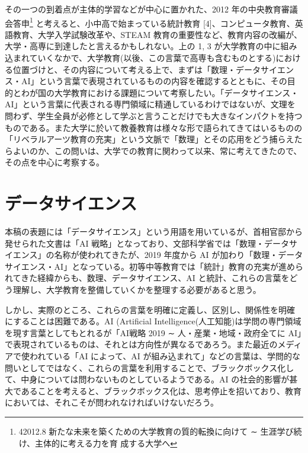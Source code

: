 \documentclass[
]{book}
\theoremstyle{definition}
\theoremstyle{definition}
\theoremstyle{definition}
\theoremstyle{definition}
\theoremstyle{remark}
\begin{document}
その一つの到着点が主体的学習などが中心に置かれた、2012 年の中央教育審議会答申\footnote{42012.8 新たな未来を築くための大学教育の質的転換に向けて ∼ 生涯学び続け、主体的に考える力を育
  成する大学へ} と考えると、小中高で始まっている統計教育 {[}4{]}、コンピュータ教育、英語教育、大学入学試験改革や、STEAM 教育の重要性など、教育内容の改編が、大学・高専に到達したと言えるかもしれない。上の 1, 3 が大学教育の中に組み込まれていくなかで、大学教育(以後、この言葉で高専も含むものとする)における位置づけと、その内容について考える上で、まずは「数理・データサイエンス・AI」という言葉で表現されているものの内容を確認するとともに、その目的とわが国の大学教育における課題について考察したい。「データサイエンス・AI」という言葉に代表される専門領域に精通しているわけではないが、文理を問わず、学生全員が必修として学ぶと言うことだけでも大きなインパクトを持つものである。また大学に於いて教養教育は様々な形で語られてきてはいるものの「リベラルアーツ教育の充実」という文脈で「数理」とその応用をどう捕らえたらよいのか、この問いは、大学での教育に関わって以来、常に考えてきたので、その点を中心に考察する。

\hypertarget{ux30c7ux30fcux30bfux30b5ux30a4ux30a8ux30f3ux30b9}{%
\section{データサイエンス}\label{ux30c7ux30fcux30bfux30b5ux30a4ux30a8ux30f3ux30b9}}

本稿の表題には「データサイエンス」という用語を用いているが、首相官邸から発せられた文書は「AI 戦略」となっており、文部科学省では「数理・データサイエンス」の名称が使われてきたが、2019 年度から AI が加わり「数理・データサイエンス・AI」となっている。初等中等教育では「統計」教育の充実が進められてきた経緯からも、数理、データサイエンス、AI と統計、これらの言葉をどう理解し、大学教育を整備していくかを整理する必要があると思う。

しかし、実際のところ、これらの言葉を明確に定義し、区別し、関係性を明確にすることは困難である。AI (Artificial Intelligence(人工知能)は学問の専門領域を現す言葉としてもとれるが「AI戦略 2019 ∼ 人・産業・地域・政府全てに AI」で表現されているものは、それとは方向性が異なるであろう。また最近のメディアで使われている「AI によって、AI が組み込まれて」などの言葉は、学問的な問いとしてではなく、これらの言葉を利用することで、ブラックボックス化して、中身については問わないものとしているようである。AI の社会的影響が甚大であることを考えると、ブラックボックス化は、思考停止を招いており、教育においては、それこそが問われなければいけないだろう。
\end{document}
